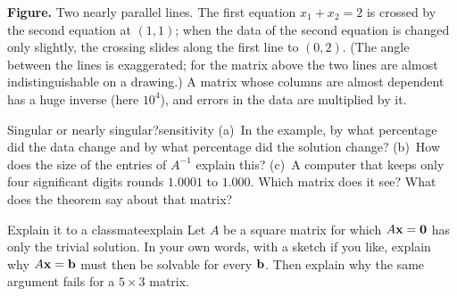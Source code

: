 \documentclass[11pt]{article}
\begin{document}
\begin{center}
\end{center}

\textbf{Figure.} Two nearly parallel lines. The first equation $x_1+x_2=2$ is crossed by the second equation at $(1,1)$; when the data of the second equation is changed only slightly, the crossing slides along the first line to $(0,2)$. (The angle between the lines is exaggerated; for the matrix above the two lines are almost indistinguishable on a drawing.) A matrix whose columns are almost dependent has a huge inverse (here $10^4$), and errors in the data are multiplied by it.

\begin{think}{Singular or nearly singular?}{sensitivity}
(a)~In the example, by what percentage did the data change and by what percentage did the solution change? (b)~How does the size of the entries of $A^{-1}$ explain this? (c)~A computer that keeps only four significant digits rounds $1.0001$ to $1.000$. Which matrix does it see? What does the theorem say about that matrix?
\end{think}

\begin{think}{Explain it to a classmate}{explain}
Let $A$ be a square matrix for which $A\mathbf{x}=\mathbf{0}$ has only the trivial solution. In your own words, with a sketch if you like, explain why $A\mathbf{x}=\mathbf{b}$ must then be solvable for every $\mathbf{b}$. Then explain why the same argument fails for a $5\times3$ matrix.
\end{think}
\end{document}
